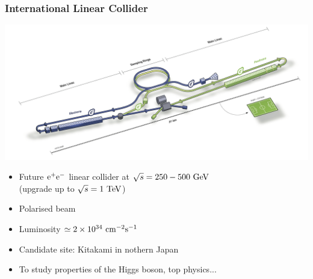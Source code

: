 \documentclass{beamer}
\begin{document}
  \begin{frame}
    \frametitle{International Linear Collider}

    \vspace{-0.3cm}
    \begin{center}
      \includegraphics[width = 9 cm]{Pictures/ILC.png}
    \end{center}

    \vspace{-0.3cm}
    \begin{itemize}
      \item Future $\rm{e}^+\rm{e}^-$ linear collider at $\sqrt{s} = 250 - 500~\rm{GeV}$ \\ (upgrade up to $\sqrt{s} = 1~\rm{TeV}$)
      \item Polarised beam
      \item Luminosity $\simeq 2 \times 10^{34}~\rm{cm}^{-2}\rm{s}^{-1}$
      \item Candidate site: Kitakami in nothern Japan
      \item To study properties of the Higgs boson, top physics...
    \end{itemize}
  \end{frame}
 
\end{document}
